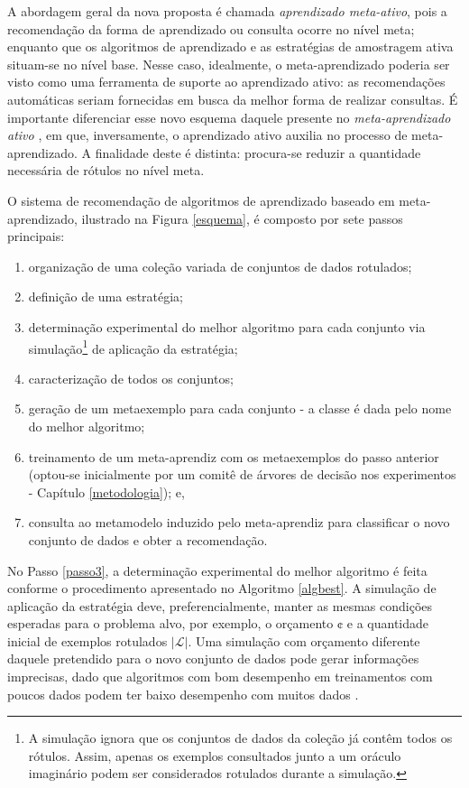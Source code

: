 A abordagem geral da nova proposta é chamada \textit{aprendizado meta-ativo}, pois a recomendação da forma de aprendizado ou consulta ocorre no nível meta; enquanto que os algoritmos de aprendizado e as estratégias de amostragem ativa situam-se no nível base.
Nesse caso, idealmente, o meta-aprendizado poderia ser visto como uma ferramenta de suporte ao aprendizado ativo: as recomendações automáticas seriam fornecidas em busca da melhor forma de realizar consultas.
É importante diferenciar esse novo esquema daquele presente no \textit{meta-aprendizado ativo} \cite{conf/ijcnn/SousaPSL13}, em que, inversamente, o aprendizado ativo auxilia no processo de meta-aprendizado.
A finalidade deste é distinta: procura-se reduzir a quantidade necessária de rótulos no nível meta.

O sistema de recomendação de algoritmos de aprendizado baseado em meta-aprendizado, ilustrado na Figura \ref{esquema}, é composto por sete passos principais:
\begin{enumerate}
  \item \label{passo1} organização de uma coleção variada de conjuntos de dados rotulados;
  \item \label{passo2} definição de uma estratégia;
  \item \label{passo3} determinação experimental do melhor algoritmo para cada conjunto via simulação\footnote{A simulação ignora que os conjuntos de dados da coleção já contêm todos os rótulos. Assim, apenas os exemplos consultados junto a um oráculo imaginário podem ser considerados rotulados durante a simulação.} de aplicação da estratégia;
  \item \label{passo4} caracterização de todos os conjuntos;
  \item \label{passo5} geração de um metaexemplo para cada conjunto - a classe é dada pelo nome do melhor algoritmo;
  \item \label{passo6} treinamento de um meta-aprendiz com os metaexemplos do passo anterior (optou-se inicialmente por um comitê de árvores de decisão nos experimentos - Capítulo \ref{metodologia}); e,
  \item \label{passo7} consulta ao metamodelo induzido pelo meta-aprendiz para classificar o novo conjunto de dados e obter a recomendação.
\end{enumerate}
No Passo \ref{passo3}, a determinação experimental do melhor algoritmo é feita conforme o procedimento apresentado no Algoritmo \ref{algbest}.
A simulação de aplicação da estratégia deve, preferencialmente, manter as mesmas condições esperadas para o problema alvo, por exemplo, o orçamento $\cent$ e a quantidade inicial de exemplos rotulados $|\mathcal{L}|$.
Uma simulação com orçamento diferente daquele pretendido para o novo conjunto de dados
pode gerar informações imprecisas, dado que algoritmos com bom desempenho em treinamentos com poucos dados podem ter baixo desempenho com muitos dados \cite{journals/sigkdd/AttenbergP10,journals/jmlr/PerlichPS03}.

